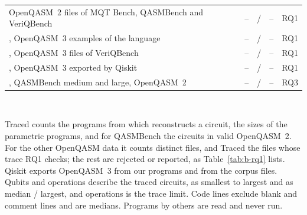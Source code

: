 \begin{table}[t]
\begin{tabularx}{\textwidth}{@{}>{\raggedright\arraybackslash}X r r r r r >{\raggedright\arraybackslash}p{2.6cm}@{}}
    OpenQASM~2 files of MQT Bench, QASMBench and VeriQBench & \numSubjOqtwoCount{} & \numSubjOqtwoTraced{} & \numSubjOqtwoMinQubits{}--\numSubjOqtwoMaxQubits{} &
      \numSubjOqtwoMedianOps{} / \numSubjOqtwoMaxOps{} & -- & RQ1 \\ \sep
    OpenQASM~3 examples of the language & \numSubjOqthreeExCount{} & \numSubjOqthreeExTraced{} & \numSubjOqthreeExMinQubits{}--\numSubjOqthreeExMaxQubits{} &
      \numSubjOqthreeExMedianOps{} / \numSubjOqthreeExMaxOps{} & -- & RQ1 \\ \sep
    OpenQASM~3 files of VeriQBench & \numSubjOqthreeVqCount{} & \numSubjOqthreeVqTraced{} & \numSubjOqthreeVqMinQubits{}--\numSubjOqthreeVqMaxQubits{} &
      \numSubjOqthreeVqMedianOps{} / \numSubjOqthreeVqMaxOps{} & -- & RQ1 \\ \sep
    OpenQASM~3 exported by Qiskit & \numSubjOqthreeRtCount{} & \numSubjOqthreeRtTraced{} & \numSubjOqthreeRtMinQubits{}--\numSubjOqthreeRtMaxQubits{} &
      \numSubjOqthreeRtMedianOps{} / \numSubjOqthreeRtMaxOps{} & -- & RQ1 \\ \sep
    QASMBench medium and large, OpenQASM~2 & \numSubjQbCount{} & \numSubjQbTraced{} & \numSubjQbMinQubits{}--\numSubjQbMaxQubits{} &
      \numSubjQbMedianOps{} / \numSubjQbMaxOps{} & -- & RQ3 \\
    \bottomrule
  \end{tabularx}\\[3pt]
  \begin{minipage}{\textwidth}\footnotesize
  Traced counts the programs from which \tool{} reconstructs a circuit, the sizes of the parametric programs, and for
  QASMBench the circuits in valid OpenQASM~2. For the other OpenQASM data it counts distinct files, and Traced the
  files whose trace RQ1 checks; the rest are rejected or reported, as Table~\ref{tab:b-rq1} lists. Qiskit exports
  OpenQASM~3 from our programs and from the corpus files. Qubits and operations describe the traced circuits, as smallest to largest
  and as median / largest, and \numToolMaxOps{} operations is the trace limit. Code lines exclude blank and comment
  lines and are medians. Programs by others are read and never run.
  \end{minipage}
\end{table}

